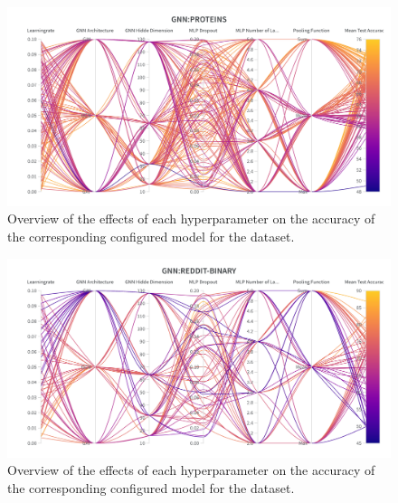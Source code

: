 \begin{figure}[H]
    \centering
    \includegraphics[width=\textwidth]{Figures/hyperparameter_gnn_proteins.png}
    \vspace*{-30pt}
    \caption{Overview of the effects of each hyperparameter on the accuracy of the corresponding configured \gnn model for the \proteins dataset.}
\end{figure}

\begin{figure}[H]
    \centering
    \includegraphics[width=\textwidth]{Figures/hyperparameter_gnn_reddit.png}
    \vspace*{-30pt}
    \caption{Overview of the effects of each hyperparameter on the accuracy of the corresponding configured \gnn model for the \reddit dataset.}
\end{figure}

